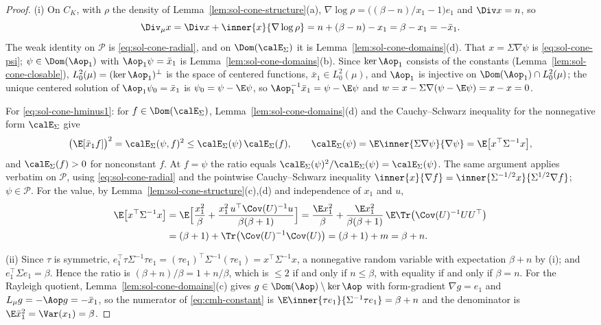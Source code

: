 \documentclass[../main.tex]{subfiles}
\begin{document}
\begin{proof}
(i) On $C_K$, with $\rho$ the density of Lemma~\ref{lem:sol-cone-structure}(a),
$\nabla\log\rho=\bigl((\beta-n)/x_1-1\bigr)e_1$ and $\Div x=n$, so
\[
  \Div_\mu x=\Div x+\inner{x}{\nabla\log\rho}=n+(\beta-n)-x_1=\beta-x_1=-\bar x_1 .
\]
The weak identity on $\mathscr P$ is \eqref{eq:sol-cone-radial}, and on $\Dom(\calE_\Sigma)$
it is Lemma~\ref{lem:sol-cone-domains}(d).  That $x=\Sigma\nabla\psi$ is
\eqref{eq:sol-cone-psi}; $\psi\in\Dom(\Aop_1)$ with $\Aop_1\psi=\bar x_1$ is
Lemma~\ref{lem:sol-cone-domains}(b).  Since $\ker\Aop_1$ consists of the constants
(Lemma~\ref{lem:sol-cone-closable}), $L^2_0(\mu)=(\ker\Aop_1)^\perp$ is the space of
centered functions, $\bar x_1\in L^2_0(\mu)$, and $\Aop_1$ is injective on
$\Dom(\Aop_1)\cap L^2_0(\mu)$; the unique centered solution of $\Aop_1\psi_0=\bar x_1$ is
$\psi_0=\psi-\E\psi$, so $\Aop_1^{-1}\bar x_1=\psi-\E\psi$ and
$w=x-\Sigma\nabla(\psi-\E\psi)=x-x=0$.

For \eqref{eq:sol-cone-hminus1}: for $f\in\Dom(\calE_\Sigma)$, Lemma~\ref{lem:sol-cone-domains}(d)
and the Cauchy--Schwarz inequality for the nonnegative form $\calE_\Sigma$ give
\[
  \bigl(\E[\bar x_1f]\bigr)^2=\calE_\Sigma(\psi,f)^2\le\calE_\Sigma(\psi)\,\calE_\Sigma(f),
  \qquad
  \calE_\Sigma(\psi)=\E\inner{\Sigma\nabla\psi}{\nabla\psi}=\E\bigl[x^\top\Sigma^{-1}x\bigr],
\]
and $\calE_\Sigma(f)>0$ for nonconstant $f$.  At $f=\psi$ the ratio equals
$\calE_\Sigma(\psi)^2/\calE_\Sigma(\psi)=\calE_\Sigma(\psi)$.  The same argument applies verbatim
on $\mathscr P$, using \eqref{eq:sol-cone-radial} and the pointwise Cauchy--Schwarz inequality
$\inner{x}{\nabla f}=\inner{\Sigma^{-1/2}x}{\Sigma^{1/2}\nabla f}$; $\psi\in\mathscr P$.  For
the value, by Lemma~\ref{lem:sol-cone-structure}(c),(d) and independence of $x_1$ and $u$,
\begin{align*}
  \E\bigl[x^\top\Sigma^{-1}x\bigr]
  &=\E\Bigl[\frac{x_1^2}{\beta}+\frac{x_1^2\,u^\top\Cov(U)^{-1}u}{\beta(\beta+1)}\Bigr]
  =\frac{\E x_1^2}{\beta}+\frac{\E x_1^2}{\beta(\beta+1)}\,\E\Tr\bigl(\Cov(U)^{-1}UU^\top\bigr)\\
  &=(\beta+1)+\Tr\bigl(\Cov(U)^{-1}\Cov(U)\bigr)=(\beta+1)+m=\beta+n .
\end{align*}

(ii) Since $\tau$ is symmetric, $e_1^\top\tau\Sigma^{-1}\tau e_1=(\tau e_1)^\top\Sigma^{-1}(\tau e_1)
=x^\top\Sigma^{-1}x$, a nonnegative random variable with expectation $\beta+n$ by (i); and
$e_1^\top\Sigma e_1=\beta$.  Hence the ratio is $(\beta+n)/\beta=1+n/\beta$, which is $\le2$
if and only if $n\le\beta$, with equality if and only if $\beta=n$.  For the Rayleigh quotient,
Lemma~\ref{lem:sol-cone-domains}(c) gives $g\in\Dom(\Aop)\setminus\ker\Aop$ with form-gradient
$\nabla g=e_1$ and $L_\mu g=-\Aop g=-\bar x_1$, so the numerator of \eqref{eq:cmh-constant} is
$\E\inner{\tau e_1}{\Sigma^{-1}\tau e_1}=\beta+n$ and the denominator is
$\E\bar x_1^2=\Var(x_1)=\beta$.


\end{proof}
\end{document}
